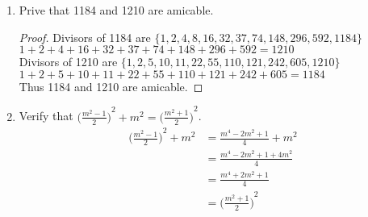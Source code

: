 \documentclass[11pt]{article}
\begin{document}
\begin{enumerate}
\begin{proof}
        Hypothesis ($n=k$): \\
        Assume $t_k= \sum\limits_{i=1}^{k}i=1+2+\cdots+k=\displaystyle\frac{k(k+1)}{2}$ $\forall k \in \mathbb{Z}^{+}$ \\
        Induction ($n=k+1$): \\
        Consider $\sum\limits_{i=1}^{k+1}i$, then
        \begin{align*}
            \sum_{i=1}^{k+1}i &= 1+2+\cdots+k+(k+1) \\
            &= \frac{k(k+1)}{2} + (k+1) && \text{(Hypothesis)} \\
            &= \frac{k^2+k+2(k+1)}{2} \\
            &= \frac{k^2+3k+2}{2} \\
            &= \frac{(k+1)(k+2)}{2} = \frac{(k+1)((k+1)+1)}{2}
        \end{align*}
        \[\therefore t_n=\sum\limits_{i=1}^{n}i=\displaystyle\frac{n(n+1)}{2}\]
    \end{proof}
    \item Prive that 1184 and 1210 are amicable.
    \begin{proof}
    Divisors of 1184 are $\{1, 2, 4, 8, 16, 32, 37, 74,148, 296, 592, 1184\}$ \\
    $1+2+4+16+32+37+74+148+296+592=1210$ \\
    Divisors of 1210 are $\{1, 2, 5, 10, 11, 22, 55, 110, 121, 242, 605, 1210\}$ \\
    $1+2+5+10+11+22+55+110+121+242+605=1184$ \\
    Thus 1184 and 1210 are amicable.
    \end{proof}
    
    \item Verify that ${\bigg(\frac{m^2-1}{2}\bigg)}^2+m^2={\bigg(\frac{m^2+1}{2}\bigg)}^2$.
    \begin{align*}
        {\Bigg(\frac{m^2-1}{2}\Bigg)}^2+m^2 &= \frac{m^4-2m^2+1}{4}+m^2 \\
        &= \frac{m^4-2m^2+1+4m^2}{4} \\
        &= \frac{m^4+2m^2+1}{4} \\
        &= {\Bigg(\frac{m^2+1}{2}\Bigg)}^2
    \end{align*}
\end{enumerate}
\end{document}
